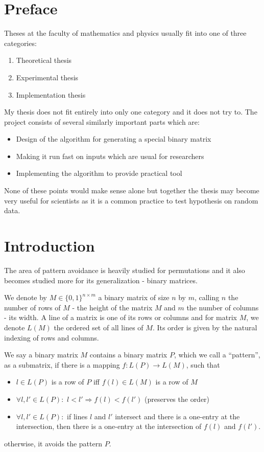 \chapter*{Preface}
Theses at the faculty of mathematics and physics usually fit into one of three categories:
\begin{enumerate}
\item Theoretical thesis
\item Experimental thesis
\item Implementation thesis
\end{enumerate}
My thesis does not fit entirely into only one category and it does not try to. The project consists of several similarly important parts which are:
\begin{itemize}
\item Design of the algorithm for generating a special binary matrix
\item Making it run fast on inputs which are usual for researchers
\item Implementing the algorithm to provide practical tool
\end{itemize}
None of these points would make sense alone but together the thesis may become very useful for scientists as it is a common practice to test hypothesis on random data.
\chapter*{Introduction}
The area of pattern avoidance is heavily studied for permutations and it also becomes studied more for its generalization - binary matrices.

We denote by $M\in\{0,1\}^{n\times m}$ a binary matrix of size $n$ by $m$, calling $n$ the number of rows of $M$ - the height of the matrix $M$ and $m$ the number of columns - its width. A line of a matrix is one of its rows or columns and for matrix $M$, we denote $L(M)$ the ordered set of all lines of $M$. Its order is given by the natural indexing of rows and columns.

We say a binary matrix $M$ contains a binary matrix $P$, which we call a ``pattern'', as a submatrix, if there is a mapping $f:L(P)\rightarrow L(M)$, such that
\begin{itemize}
\item $l\in L(P)$ is a row of $P$ iff $f(l)\in L(M)$ is a row of $M$
\item $\forall l,l'\in L(P):$ $l<l'\Rightarrow f(l)<f(l')$ (preserves the order)
\item $\forall l,l'\in L(P):$ if lines $l$ and $l'$ intersect and there is a one-entry at the intersection, then there is a one-entry at the intersection of $f(l)$ and $f(l')$.
\end{itemize}
otherwise, it avoids the pattern $P$.

